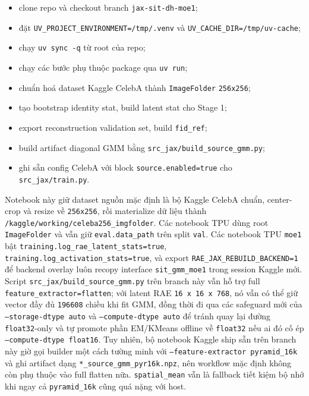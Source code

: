 \begin{itemize}[leftmargin=1.5em]
  \item clone repo và checkout branch \texttt{jax-sit-dh-moe1};
  \item đặt \texttt{UV\_PROJECT\_ENVIRONMENT=/tmp/.venv} và \texttt{UV\_CACHE\_DIR=/tmp/uv-cache};
  \item chạy \texttt{uv sync -q} từ root của repo;
  \item chạy các bước phụ thuộc package qua \texttt{uv run};
  \item chuẩn hoá dataset Kaggle CelebA thành \texttt{ImageFolder} \texttt{256x256};
  \item tạo bootstrap identity stat, build latent stat cho Stage 1;
  \item export reconstruction validation set, build \texttt{fid\_ref};
  \item build artifact diagonal GMM bằng \texttt{src\_jax/build\_source\_gmm.py};
  \item ghi sẵn config CelebA với block \texttt{source.enabled=true} cho \texttt{src\_jax/train.py}.
\end{itemize}

Notebook này giữ dataset nguồn mặc định là bộ Kaggle CelebA chuẩn, center-crop
và resize về \texttt{256x256}, rồi materialize dữ liệu thành
\texttt{/kaggle/working/celeba256\_imgfolder}. Các notebook TPU dùng root
\texttt{ImageFolder} và vẫn giữ \texttt{eval.data\_path} trên split
\texttt{val}. Các notebook TPU
\texttt{moe1} bật \texttt{training.log\_rae\_latent\_stats=true},
\texttt{training.log\_activation\_stats=true}, và export
\texttt{RAE\_JAX\_REBUILD\_BACKEND=1} để backend overlay luôn recopy interface
\texttt{sit\_gmm\_moe1} trong session Kaggle mới. Script
\texttt{src\_jax/build\_source\_gmm.py} trên branch này vẫn hỗ trợ full
\texttt{feature\_extractor=flatten}; với latent RAE \texttt{16 x 16 x 768}, nó
vẫn có thể giữ vector đầy đủ \texttt{196608} chiều khi fit GMM, đồng thời đi
qua các safeguard mới của \texttt{--storage-dtype auto} và
\texttt{--compute-dtype auto} để tránh quay lại đường \texttt{float32}-only và
tự promote phần EM/KMeans offline về \texttt{float32} nếu ai đó cố ép
\texttt{--compute-dtype float16}. Tuy nhiên, bộ notebook Kaggle ship sẵn trên
branch này giờ gọi builder một cách tường minh với
\texttt{--feature-extractor pyramid\_16k} và ghi artifact dạng
\texttt{*\_source\_gmm\_pyr16k.npz}, nên workflow mặc định không còn phụ thuộc
vào full flatten nữa. \texttt{spatial\_mean} vẫn là fallback tiết kiệm bộ nhớ
khi ngay cả \texttt{pyramid\_16k} cũng quá nặng với host.

